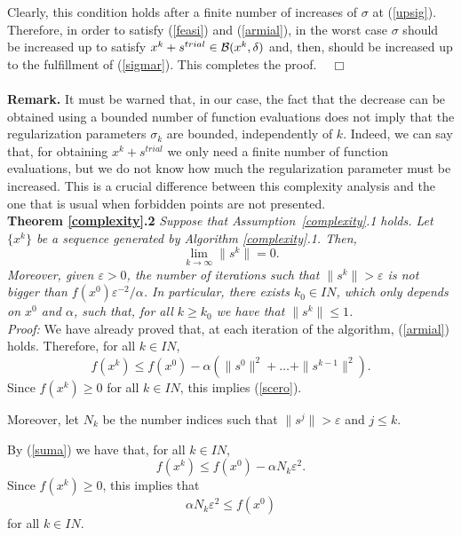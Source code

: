 \documentclass{article}
\newcommand{\N}         {I\!\!N}
\newcommand{\halmos}    {\hfill $\;\;\;\Box$\\}
\newcommand{\B}{{\cal B}}
\begin{document}
Clearly, this condition holds after a finite number of increases of $\sigma$ at (\ref{upsig}). Therefore, 
  in order to satisfy (\ref{feasi}) and (\ref{armial}), in the worst case $\sigma$ should be increased up to
  satisfy $x^k + s^{trial} \in \B(x^k, \delta)$ and, then, should be increased up to the fulfillment of (\ref{sigmar}). 
   This completes the proof. \halmos\\

  \noindent
{\bf Remark.} It must be warned that, in our case, the fact that the decrease can be obtained using a bounded number
  of function evaluations does not imply that the regularization parameters $\sigma_k$ are bounded, independently of $k$. Indeed, we can say that,
for obtaining $x^k + s^{trial}$ we only need a finite number of function evaluations, but we do not know how much
  the regularization parameter must be increased. This is a crucial difference between this complexity analysis and
  the one that is usual when forbidden points are not presented.\\        








\noindent
{\bf Theorem \ref{complexity}.2} {\it Suppose that Assumption~\ref{complexity}.1 holds. Let $\{x^k\}$ be a sequence generated by Algorithm \ref{complexity}.1. 
  Then, 
\begin{equation} \label{scero}
\lim_{k \to \infty} \|s^k\| = 0.
\end{equation}
Moreover, given $\varepsilon > 0$, the number of iterations such that $\|s^k\| > \varepsilon$ is not bigger than
${f(x^0) \varepsilon^{-2}/\alpha}$. In particular, there exists $k_0 \in \N$, which only depends on $x^0$ and $\alpha$,
    such that, for all $k \geq k_0$ we have that
    $\|s^k\| \leq 1$. \\

\noindent
Proof:} We have already proved that, at each iteration of the algorithm, (\ref{armial}) holds. Therefore, for all $k \in \N$,
\begin{equation} \label{suma}
f(x^k) \leq f(x^0) - \alpha (\|s^0\|^2 + \ldots + \|s^{k-1}\|^2).
\end{equation}
Since $f(x^k) \geq 0$ for all $k \in \N$, this implies (\ref{scero}).

Moreover, let $N_k$ be the number indices such that $\|s^j\| > \varepsilon$ and $j \leq k$.

By (\ref{suma}) we have that, for all $k \in \N$,
\[
f(x^k) \leq f(x^0) - \alpha N_k \varepsilon^2.
\]
Since $f(x^k) \geq 0$, this implies that 
\[
\alpha N_k \varepsilon^2 \leq f(x^0) 
\]
for all $k \in \N$. 
\end{document}
